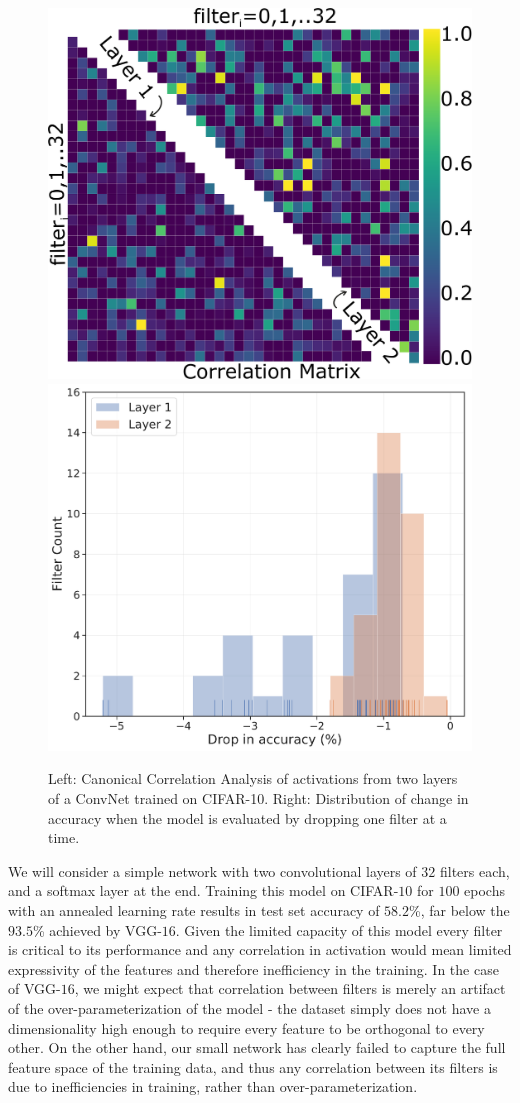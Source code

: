\begin{figure}[H]
   \includegraphics[width=0.49\linewidth]{figures/repr/Filter_CCA.pdf}
   \includegraphics[width=0.49\linewidth]{figures/repr/Error_Distribution.pdf}
   \caption[Correlation Analysis of filters]{Left: Canonical Correlation Analysis of activations from two layers of a ConvNet trained on CIFAR-10. Right: Distribution of change in accuracy when the model is evaluated by dropping one filter at a time.}
   \label{fig:CCA}
\end{figure}

We will consider a simple network with two convolutional layers of $32$ filters each, and a softmax layer at the end.
Training this model on CIFAR-$10$ for $100$ epochs with an annealed learning rate results in test set accuracy of $58.2$\%, far below the $93.5$\% achieved by VGG-$16$.
Given the limited capacity of this model every filter is critical to its performance and any correlation in activation would mean limited expressivity of the features and therefore inefficiency in the training.
In the case of VGG-$16$, we might expect that correlation between filters is merely an artifact of the over-parameterization of the model - the dataset simply does not have a dimensionality high enough to require every feature to be orthogonal to every other.
On the other hand, our small network has clearly failed to capture the full feature space of the training data, and thus any correlation between its filters is due to inefficiencies in training, rather than over-parameterization.

